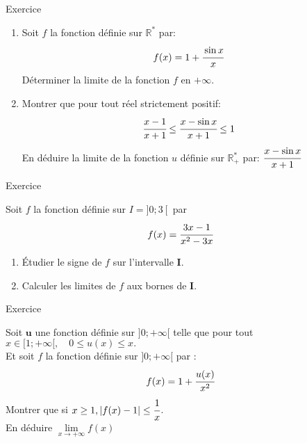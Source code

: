 \documentclass[a4paper,10pt]{article}
\newcounter{numexo}
\newcommand{\numexo}{Exercice \thenumexo \addtocounter{numexo}{1} }
\begin{document}
\begin{multicols}{2}
\begin{mynewbox}{\numexo}
\begin{enumerate}
\item Soit $f$ la fonction définie sur $\mathbb{R}^{*}$ par: $$ f(x)=1+\cfrac{\sin x}{x} $$
Déterminer la limite de la fonction $f$ en $+\infty$.
\item Montrer que pour tout réel strictement positif: $$ \cfrac{x-1}{x+1} \leq \cfrac{x-\sin x}{x+1} \leq 1 $$
En déduire la limite de la fonction $u$ définie sur $\mathbb{R}_{+}^{*}$ par: $\cfrac{x-\sin x}{x+1}$
\end{enumerate}
\end{mynewbox}
\begin{mynewbox}{\numexo}
Soit $f$ la fonction définie sur $I =] 0 ; 3\left[\right.$ par $$ f(x)=\cfrac{3 x-1}{x^{2}-3 x} $$
\begin{enumerate}
\item Étudier le signe de $f$ sur l'intervalle $\boldsymbol{I}$.
\item Calculer les limites de $f$ aux bornes de $\boldsymbol{I}$.
\end{enumerate}
\end{mynewbox}
\begin{mynewbox}{\numexo}
Soit $\boldsymbol{u}$ une fonction définie sur $ ] 0 ;+\infty[$ telle que pour tout $x \in[1 ;+\infty[, \quad 0 \leq u(x) \leq x .$\\
Et soit $f$ la fonction définie sur $] 0 ;+\infty[$ par :
$$ f(x)=1+\cfrac{u(x)}{x^{2}} $$
Montrer que si $x \geq 1, |f(x)-1| \leq \cfrac{1}{x}$.\\
En déduire $\lim\limits_{x \rightarrow+\infty} f(x)$
\end{mynewbox}
\end{multicols}
\end{document}
